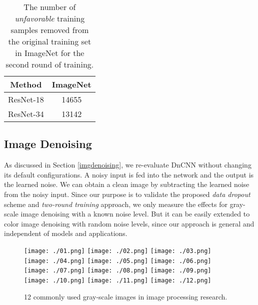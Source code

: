 \documentclass[10pt, conference, letterpaper]{IEEEtran}
\begin{document}
\renewcommand{\arraystretch}{1.06}
\setlength{\tabcolsep}{1.0em}
\begin{table}[]
\center
\begin{tabular}{l|c}
\hline
\multicolumn{1}{c|}{Method} & ImageNet  \\ \hline
ResNet-18 \cite{he2016deep} & 14655  \\ \hline
ResNet-34 \cite{he2016deep} & 13142 \\ \hline
\end{tabular}
\vspace{0.5ex}
\caption{The number of \emph{unfavorable} training samples removed from the original training set in ImageNet for the second round of training.}
\label{imagenet_numdrop}
\vspace{-1ex}
\end{table}



\subsection{Image Denoising}
As discussed in Section \ref{imgdenoising}, we re-evaluate DnCNN \cite{zhang2017beyond} without changing its default configurations. A noisy input is fed into the network and the output is the learned noise. We can obtain a clean image by subtracting the learned noise from the noisy input. Since our purpose is to validate the proposed \emph{data dropout} scheme and \emph{two-round training} approach, we only measure the effects for gray-scale image denoising with a known noise level. But it can be easily extended to color image denoising with random noise levels, since our approach is general and independent of models and applications.


\begin{figure*}[!htbp]
\begin{center}
\subfigure
{\texttt{[image: ./01.png]}}
\subfigure
{\texttt{[image: ./02.png]}}
\subfigure
{\texttt{[image: ./03.png]}}
\subfigure
{\texttt{[image: ./04.png]}}
\subfigure
{\texttt{[image: ./05.png]}}
\subfigure
{\texttt{[image: ./06.png]}}
\subfigure
{\texttt{[image: ./07.png]}}
\subfigure
{\texttt{[image: ./08.png]}}
\subfigure
{\texttt{[image: ./09.png]}}
\subfigure
{\texttt{[image: ./10.png]}}
\subfigure
{\texttt{[image: ./11.png]}}
\subfigure
{\texttt{[image: ./12.png]}}
\caption{12 commonly used gray-scale images in image processing research.}
\label{12images}
\end{center}
\end{figure*}
\end{document}
